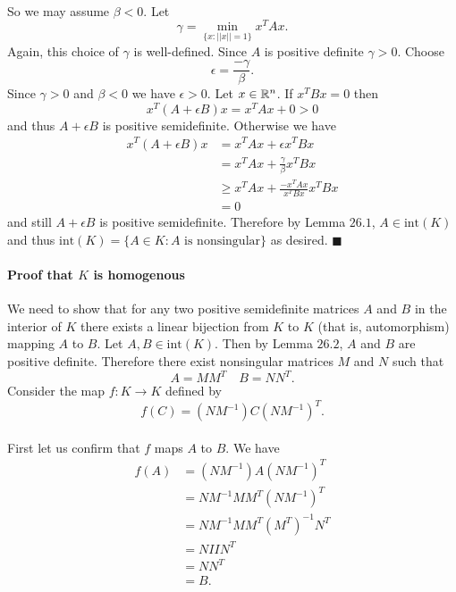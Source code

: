 \documentclass[letterpaper,12pt,oneside,onecolumn]{article}
\begin{document}
\paragraph{}
So we may assume $\beta < 0$.  Let
$$ \gamma = \min_{\{x: ||x|| = 1\}} x^TAx .$$
Again, this choice of $\gamma$ is well-defined. Since $A$ is positive definite $\gamma > 0$.
Choose $$\epsilon = \frac{-\gamma}{\beta}.$$ Since $\gamma > 0$ and $\beta < 0$ we have $\epsilon > 0$. Let $x \in \mathbb{R}^n$. If $x^TBx = 0$ then
$$x^T(A+\epsilon B) x = x^TAx + 0 > 0$$ and thus $A + \epsilon B$ is positive semidefinite. Otherwise we have
\begin{align*}
x^T(A + \epsilon B) x &= x^TAx + \epsilon x^T B x \\
&= x^TAx + \frac{\gamma}{\beta} x^T B x \\
&\geq x^TAx + \frac{-x^TAx}{x^TBx} x^TBx  \\
&= 0
\end{align*}
and still $A + \epsilon B$ is positive semidefinite. Therefore by Lemma $26.1$, $A \in \text{int}(K)$ and thus $\text{int}(K) = \{A \in K : A \text{ is nonsingular}\}$ as desired. $\blacksquare$
\paragraph{Proof that $K$ is homogenous}
We need to show that for any two positive semidefinite matrices $A$ and $B$ in the interior of $K$ there exists a linear bijection from $K$ to $K$ (that is, automorphism) mapping $A$ to $B$. Let $A, B \in \text{int}(K)$. Then by Lemma $26.2$, $A$ and $B$ are positive definite. Therefore there exist nonsingular matrices $M$ and $N$ such that
$$ A = MM^T \quad B = NN^T.$$
Consider the map $f: K \rightarrow K$ defined by
$$f(C) = (NM^{-1})C(NM^{-1})^T.$$
\paragraph{}
First let us confirm that $f$ maps $A$ to $B$. We have
\begin{align*}
f(A) &= (NM^{-1})A(NM^{-1})^T \\
&= NM^{-1} MM^T(NM^{-1})^T \\
&=NM^{-1}MM^T(M^T)^{-1} N^T \\
&= N I I N^T \\
&= NN^T \\
&= B.
\end{align*}
\end{document}
